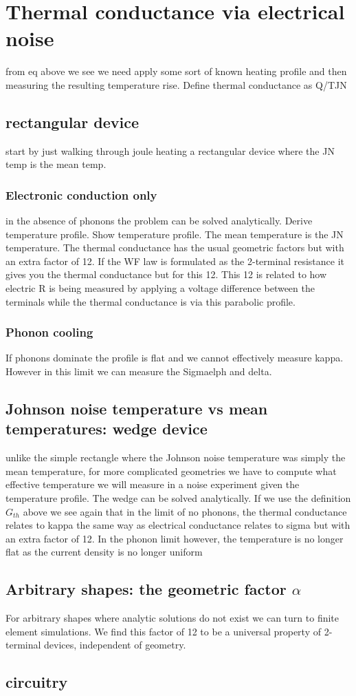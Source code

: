 \chapter{Thermal conductance via electrical noise}
\label{ch:thermal_conductance_via_electrical_noise}

from eq above we see we need apply some sort of known heating profile and then measuring the resulting temperature rise. Define thermal conductance as Q/TJN

\section{rectangular device}
start by just walking through joule heating a rectangular device where the JN temp is the mean temp.

\subsection{Electronic conduction only}
in the absence of phonons the problem can be solved analytically. Derive temperature profile. Show temperature profile. The mean temperature is the JN temperature. The thermal conductance has the usual geometric factors but with an extra factor of 12. If the WF law is formulated as the 2-terminal resistance it gives you the thermal conductance but for this 12. This 12 is related to how electric R is being measured by applying a voltage difference between the terminals while the thermal conductance is via this parabolic profile.

\subsection{Phonon cooling}
If phonons dominate the profile is flat and we cannot effectively measure kappa. However in this limit we can measure the Sigmaelph and delta.

\section{Johnson noise temperature vs mean temperatures: wedge device}
unlike the simple rectangle where the Johnson noise temperature was simply  the mean temperature, for more complicated geometries we have to compute what  effective temperature we will measure in a noise experiment given the temperature profile. The wedge can be solved analytically.  If we use the definition $G_{th}$ above we see again that in the limit of no phonons, the thermal conductance relates to kappa the same way as electrical conductance relates to sigma but with an extra factor of 12.
In the phonon limit however, the temperature is no longer flat as the current density is no longer uniform

\section{Arbitrary shapes: the geometric factor $\alpha$}
For arbitrary shapes where analytic solutions do not exist we can turn to finite element simulations. We find this factor of 12 to be a universal property of 2-terminal devices, independent of geometry.

\section{circuitry}
